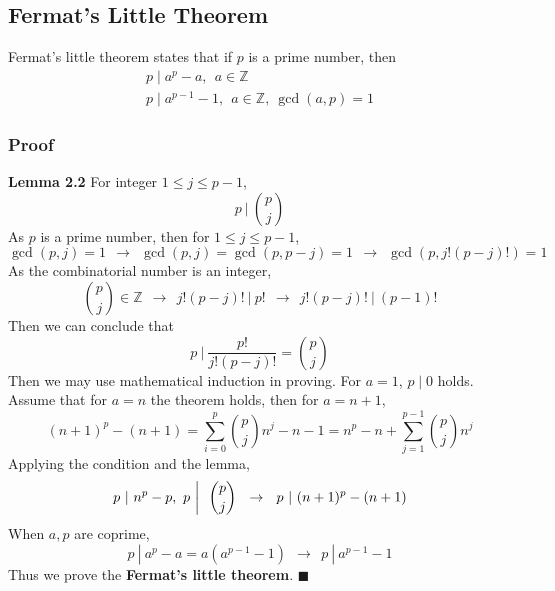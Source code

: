 \documentclass[11pt]{article}
\begin{document}
\subsection{Fermat's Little Theorem}
Fermat's little theorem states that if $p$ is a prime number, then
\begin{gather}
    p \mid a^p - a,~~a \in \mathbb{Z} \\
    p \mid a^{p-1} - 1,~~ a \in \mathbb{Z},~\gcd(a,p)=1
\end{gather}
\subsubsection*{Proof}
\noindent \textbf{Lemma 2.2} For integer $1 \leq j \leq p-1$,
\begin{equation}
    p~\bigg|~\binom{p}{j}
\end{equation}
As $p$ is a prime number, then for $1 \leq j \leq p-1$,
\begin{equation}
    \gcd(p,j) = 1~~\rightarrow~~\gcd(p, j) = \gcd(p,p-j) = 1~~\rightarrow~~\gcd(p, j!(p-j)!) = 1
\end{equation}
As the combinatorial number is an integer, 
\begin{equation}
    \binom{p}{j} \in \mathbb{Z}~~\rightarrow~~j!(p-j)!~|~p!~~\rightarrow~~j!(p-j)!~|~(p-1)!
\end{equation}
Then we can conclude that
\begin{equation}
    p~\bigg|~\frac{p!}{j!(p-j)!} = \binom{p}{j}
\end{equation}
Then we may use mathematical induction in proving. For $a=1$, $p \mid 0$ holds. Assume that for $a=n$ the theorem holds, then for $a = n+1$,
\begin{equation}
    (n+1)^p - (n+1) = \sum_{i=0}^p \binom{p}{j} n^{j} - n - 1 = n^p - n + \sum_{j=1}^{p-1} \binom{p}{j} n^j
\end{equation}
Applying the condition and the lemma,
\begin{equation}
    p~|~n^p-p,~p~\bigg|~~\binom{p}{j}~~\rightarrow~~p~|~(n+1)^p-(n+1) \notag
\end{equation}
When $a,p$ are coprime, 
\begin{equation}
    p~|~a^p-a = a(a^{p-1}-1)~~\rightarrow~~p~|~a^{p-1}-1
\end{equation}
Thus we prove the \textbf{Fermat's little theorem}. \hfill $\blacksquare$
\end{document}
